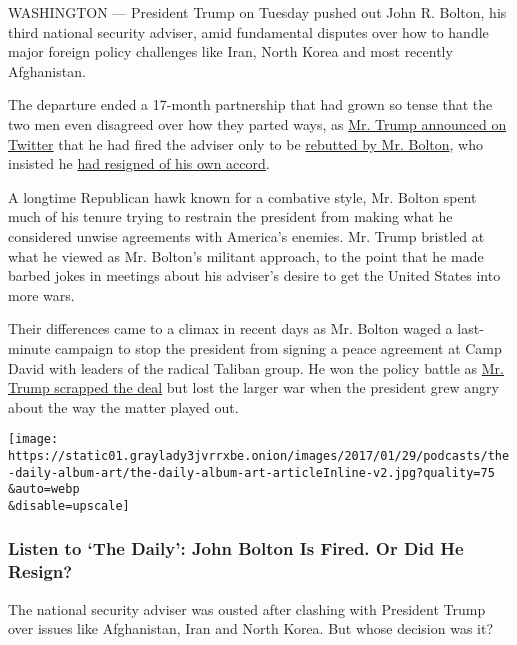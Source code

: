 WASHINGTON --- President Trump on Tuesday pushed out John R. Bolton, his
third national security adviser, amid fundamental disputes over how to
handle major foreign policy challenges like Iran, North Korea and most
recently Afghanistan.

The departure ended a 17-month partnership that had grown so tense that
the two men even disagreed over how they parted ways, as
\href{https://twitter.com/realDonaldTrump/status/1171452880055746560}{Mr.
Trump announced on Twitter} that he had fired the adviser only to be
\href{https://twitter.com/AmbJohnBolton/status/1171455806069305346?s=20}{rebutted
by Mr. Bolton}, who insisted he
\href{https://int.graylady3jvrrxbe.onion/data/documenthelper/1697-bolton-resignation-letter/1efe19fa7a0e6a93abd9/optimized/full.pdf\#page=1}{had
resigned of his own accord}.

A longtime Republican hawk known for a combative style, Mr. Bolton spent
much of his tenure trying to restrain the president from making what he
considered unwise agreements with America's enemies. Mr. Trump bristled
at what he viewed as Mr. Bolton's militant approach, to the point that
he made barbed jokes in meetings about his adviser's desire to get the
United States into more wars.

Their differences came to a climax in recent days as Mr. Bolton waged a
last-minute campaign to stop the president from signing a peace
agreement at Camp David with leaders of the radical Taliban group. He
won the policy battle as
\href{https://twitter.com/realDonaldTrump/status/1170469618177236992?s=20}{Mr.
Trump scrapped the deal} but lost the larger war when the president grew
angry about the way the matter played out.

\texttt{[image: https://static01.graylady3jvrrxbe.onion/images/2017/01/29/podcasts/the-daily-album-art/the-daily-album-art-articleInline-v2.jpg?quality=75\\\&auto=webp\\\&disable=upscale]}

\hypertarget{listen-to-the-daily-john-bolton-is-fired-or-did-he-resign}{%
\subsubsection{Listen to `The Daily': John Bolton Is Fired. Or Did He
Resign?}\label{listen-to-the-daily-john-bolton-is-fired-or-did-he-resign}}

The national security adviser was ousted after clashing with President
Trump over issues like Afghanistan, Iran and North Korea. But whose
decision was it?

